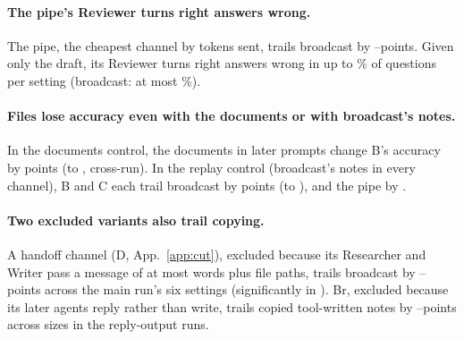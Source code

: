 \documentclass[sigplan,10pt,nonacm,review,anonymous]{acmart}
\begin{document}
\paragraph{The pipe's Reviewer turns right answers wrong.} The pipe, the cheapest channel by tokens sent,
trails broadcast by \nGapATwoMin--\nGapATwoMax points. Given only
the draft, its Reviewer turns right answers wrong in up to \nPipeBrokeMax{}\% of questions per setting
(broadcast: at most \nPipeBrokeAOne{}\%).

\paragraph{Files lose accuracy even with the documents or with broadcast's notes.} In the documents
control, the documents in later prompts change B's accuracy by \nScopeBDVsB points (\nScopeBDVsBLo to
\nScopeBDVsBHi, cross-run). In the replay control (broadcast's notes in every channel), B and C each trail broadcast by \nRepFileGap points
(\nRepFileGapLo to \nRepFileGapHi), and the pipe by \nRepATwoGap.

\paragraph{Two excluded variants also trail copying.} A handoff channel (D, App.~\ref{app:cut}), excluded because its Researcher
and Writer pass a message of at most \nHandoffWords words plus file paths, trails broadcast by
\nGapDMin--\nGapDMax points across the main run's six settings (significantly in \nGapDSigWord). Br, excluded
because its later agents reply rather than write, trails copied tool-written notes by
\nRFourteenBrGapMin--\nRFourteenBrGapMax points across sizes in the reply-output runs.
\end{document}
